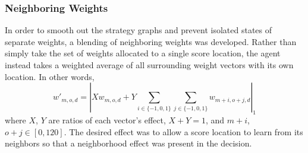 

\subsubsection{Neighboring Weights}


In order to smooth out the strategy graphs
and prevent isolated states of separate weights,
a blending of neighboring weights was developed.
%
Rather than simply take the set of weights allocated to a single score location,
the agent instead takes a weighted average of all surrounding weight vectors
with its own location.
%
In other words,
\[
    w'_{m,o,d} = %
    \left|
    Xw_{m,o,d} +
    Y \sum_{i\in\{-1,0,1\}} \sum_{j\in\{-1,0,1\}} w_{m+i,o+j,d}
    \right|_1
\]
where $X$, $Y$ are ratios of each vector's effect, $X+Y = 1$,
and $m+i$, $o+j \in [0,120]$.
%
The desired effect was to allow a score location to learn from its neighbors
so that a neighborhood effect was present in the decision.

